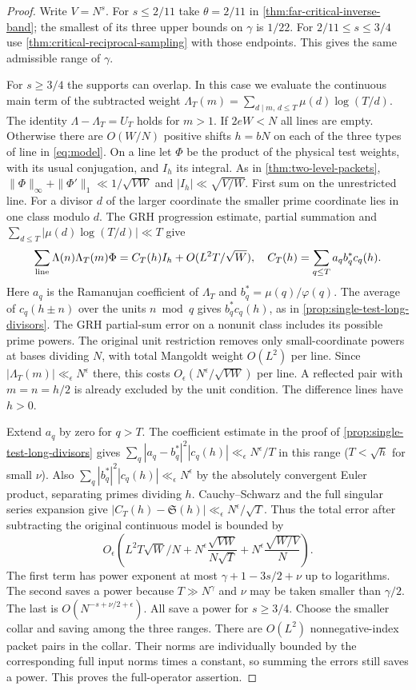 \documentclass[11pt,a4paper]{article}
\numberwithin{equation}{section}
\newcommand{\SSS}{\mathfrak S}
\begin{document}
\begin{proof}
Write $V=N^s$. For $s\le2/11$ take $\theta=2/11$ in
\cref{thm:far-critical-inverse-band}; the smallest of its three
upper bounds on $\gamma$ is $1/22$. For $2/11\le s\le3/4$
use \cref{thm:critical-reciprocal-sampling} with those
endpoints. This gives the same admissible range of $\gamma$.

For $s\ge3/4$ the supports can overlap. In this case we
evaluate the continuous main term of the subtracted weight
$\Lambda_T(m)=\sum_{d\mid m,\,d\le T}\mu(d)\log(T/d)$.
The identity $\Lambda-\Lambda_T=U_T$ holds for $m>1$.
If $2eW<N$ all lines are empty. Otherwise there are $O(W/N)$
positive shifts $h=bN$ on each of the three types of line in
\eqref{eq:model}. On a line let $\Phi$ be the product of the
physical test weights, with its usual conjugation, and $I_h$
its integral. As in \cref{thm:two-level-packets},
$\|\Phi\|_\infty+\|\Phi'\|_1\ll1/\sqrt{VW}$ and
$|I_h|\ll\sqrt{V/W}$. First sum on the unrestricted line.
For a divisor $d$ of the larger coordinate the smaller prime
coordinate lies in one class modulo $d$. The GRH progression
estimate, partial summation and
$\sum_{d\le T}|\mu(d)\log(T/d)|\ll T$ give
\[
 \sum_{\rm line}\Lambda(n)\Lambda_T(m)\Phi
    = C_T(h)I_h+O(L^2T/\sqrt W),\quad
 C_T(h)=\sum_{q\le T} a_q b_q^* c_q(h).
\]
Here $a_q$ is the Ramanujan coefficient of $\Lambda_T$ and
$b_q^*=\mu(q)/\varphi(q)$. The average of $c_q(h\pm n)$ over
the units $n\bmod q$ gives $b_q^*c_q(h)$, as in
\cref{prop:single-test-long-divisors}. The GRH partial-sum
error on a nonunit class includes its possible prime powers.
The original unit restriction removes only small-coordinate
powers at bases dividing $N$, with total Mangoldt weight
$O(L^2)$ per line. Since $|\Lambda_T(m)|\ll_\epsilon N^\epsilon$
there, this costs $O_\epsilon(N^\epsilon/\sqrt{VW})$ per
line. A reflected pair with $m=n=h/2$ is already excluded
by the unit condition. The difference lines have $h>0$.

Extend $a_q$ by zero for $q>T$. The coefficient estimate in
the proof of \cref{prop:single-test-long-divisors} gives
$\sum_q|a_q-b_q^*|^2|c_q(h)|\ll_\epsilon N^\epsilon/T$
in this range ($T<\sqrt h$ for small $\nu$).
Also $\sum_q|b_q^*|^2|c_q(h)|\ll_\epsilon N^\epsilon$
by the absolutely convergent Euler product, separating primes
dividing $h$. Cauchy--Schwarz and the full singular series
expansion give $|C_T(h)-\SSS(h)|\ll_\epsilon N^\epsilon/\sqrt T$.
Thus the total error after subtracting the original continuous
model is bounded by
\[
 O_\epsilon\left(L^2 T\sqrt W/N
      +N^\epsilon\frac{\sqrt{VW}}{N\sqrt T}
      +N^\epsilon\frac{\sqrt{W/V}}N\right).
\]
The first term has power exponent at most
$\gamma+1-3s/2+\nu$ up to logarithms. The second saves a
power because $T\gg N^\gamma$ and $\nu$ may be taken smaller
than $\gamma/2$. The last is $O(N^{-s+\nu/2+\epsilon})$.
All save a power for $s\ge3/4$. Choose the smaller collar
and saving among the three ranges. There are $O(L^2)$
nonnegative-index packet pairs in the collar. Their norms
are individually bounded by the corresponding full input
norms times a constant, so summing the errors still saves
a power. This proves the full-operator assertion.
\end{proof}
\end{document}
